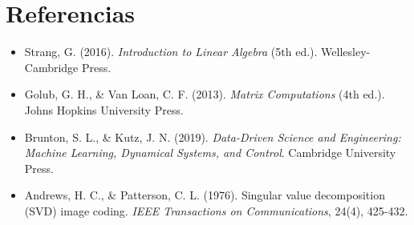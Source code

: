 \documentclass[12pt,a4paper]{article}
\begin{document}
	\section{Referencias}
	
	\begin{itemize}
		\item Strang, G. (2016). \textit{Introduction to Linear Algebra} (5th ed.). Wellesley-Cambridge Press.
		\item Golub, G. H., \& Van Loan, C. F. (2013). \textit{Matrix Computations} (4th ed.). Johns Hopkins University Press.
		\item Brunton, S. L., \& Kutz, J. N. (2019). \textit{Data-Driven Science and Engineering: Machine Learning, Dynamical Systems, and Control}. Cambridge University Press.
		\item Andrews, H. C., \& Patterson, C. L. (1976). Singular value decomposition (SVD) image coding. \textit{IEEE Transactions on Communications}, 24(4), 425-432.
	\end{itemize}
	
\end{document}
